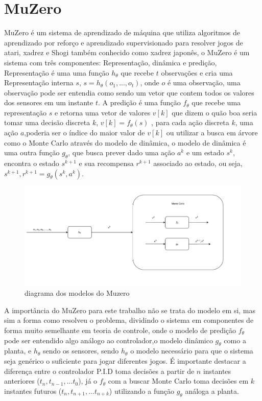 
\label{Cap:TrabalhosRelacionados}


\section{MuZero}

MuZero é um sistema de aprendizado de máquina que utiliza algoritmos de
aprendizado por reforço e aprendizado supervisionado para
resolver jogos de atari, xadrez e Shogi também conhecido como
xadrez japonês, o MuZero é um sistema com três componentes:
Representação, dinâmica e predição, Representação é uma uma
função $h_{\theta}$  que recebe $t$ observações 
e cria uma Representação interna $s$, $s = h_{\theta}(o_1,...,o_t)$,
onde $o$ é uma observação, uma observação pode ser entendia como sendo
um vetor que contem todos os valores dos sensores em um instante $t$.
A predição é uma função $f_{\theta}$ que recebe uma representação $s$
e retorna uma vetor de valores $v[k]$ que dizem o quão boa seria tomar
uma decisão discreta $k$,  $v[k] =  f_{\theta}(s)$ ,
para cada ação discreta $k$, uma ação $a$,poderia ser o índice do maior
valor de $v[k]$ ou utilizar a busca em árvore como o Monte Carlo através do
modelo de dinâmica, o modelo de dinâmica é uma outra função
$g_{\theta}$, que busca prever dado uma ação $a^k$ e um estado $s^{k}$,
encontra o estado $s^{k+1}$ e sua recompensa $r^{k+1}$ associado ao estado,
ou seja, $s^{k+1},r^{k+1}=  g_{\theta}(s^{k},a^k)$.


\begin{figure}[H]
    \centering
    \includegraphics[scale=0.4]{figuras/muzero_dig.pdf}
    \caption{diagrama dos modelos do Muzero}
\end{figure}

A importância do MuZero para este trabalho não se trata do modelo em si,
mas sim a forma como resolveu o problema, dividindo o sistema em componentes
de forma muito semelhante  em teoria de controle, onde
o modelo de predição  $f_{\theta}$ pode ser entendido algo
análogo ao controlador,o  modelo dinâmico $g_{\theta}$ como a planta,
e $h_{\theta}$ sendo os sensores, sendo $h_{\theta}$ o modelo
necessário  para que o sistema seja genérico o suficiente para jogar
diferentes jogos. É importante destacar a diferença entre o controlador P.I.D
toma decisões a partir de $n$ instantes anteriores ($t_n,t_{n-1},...t_{0}$), já o $f_{\theta}$
com a buscar Monte Carlo toma decisões em $k$ instantes futuros ($t_n,t_{n+1},...t_{n+k}$)
utilizando a função $g_{\theta}$ análoga a planta.

